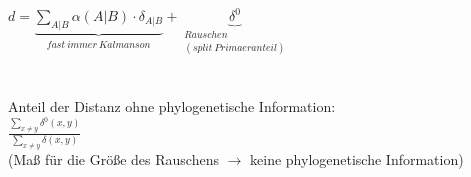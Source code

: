 $d=\underbrace{\displaystyle\sum_{A|B}\alpha(A|B) \cdot \delta_{A|B}}_{fast\ immer\ Kalmanson} + \underbrace{\delta^0}_{\substack{Rauschen \\ (split\ Primaeranteil)}}$\\\\\\
Anteil der Distanz ohne phylogenetische Information:\\
$\frac{\displaystyle\sum_{x\neq y} \delta^0(x,y)}{\displaystyle\sum_{x\neq y} \delta(x,y)}$\\
(Maß für die Größe des Rauschens $\rightarrow$ keine phylogenetische Information)
